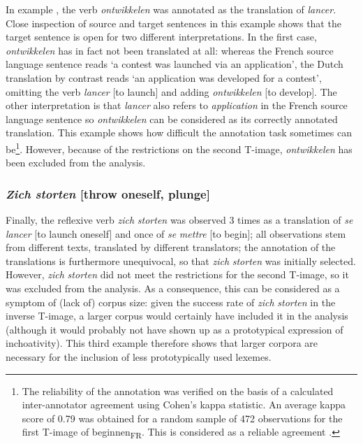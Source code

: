 In example , the verb \textit{ontwikkelen} was annotated as the translation of \textit{lancer}. Close inspection of source and target sentences in this example shows that the target sentence is open for two different interpretations. In the first case, \textit{ontwikkelen} has in fact not been translated at all: whereas the French source language sentence reads ‘a contest was launched via an application’, the Dutch translation by contrast reads ‘an application was developed for a contest’, omitting the verb \textit{lancer} [to launch] and adding \textit{ontwikkelen} [to develop]. The other interpretation is that \textit{lancer} also refers to \textit{application} in the French source language sentence so \textit{ontwikkelen} can be considered as its correctly annotated translation. This example shows how difficult the annotation task sometimes can be\footnote{The reliability of the annotation was verified on the basis of a calculated inter-annotator agreement using Cohen’s kappa statistic. An average kappa score of 0.79 was obtained for a random sample of 472 observations for the first T-image of beginnen\textsubscript{FR}. This is considered as a reliable agreement  \citep{carletta_assessing_1996}.}. However, because of the restrictions on the second T-image, \textit{ontwikkelen} has been excluded from the analysis.

\subsubsection{\textit{Zich storten} [throw oneself, plunge]}

Finally, the reflexive verb \textit{zich} \textit{storten} was observed 3 times as a translation of \textit{se} \textit{lancer} [to launch oneself] and once of \textit{se} \textit{mettre} [to begin]; all observations stem from different texts, translated by different translators; the annotation of the translations is furthermore unequivocal, so that \textit{zich} \textit{storten} was initially selected. However, \textit{zich} \textit{storten} did not meet the restrictions for the second T-image, so it was excluded from the analysis. As a consequence, this can be considered as a symptom of (lack of) corpus size: given the success rate of \textit{zich} \textit{storten} in the inverse T-image, a larger corpus would certainly have included it in the analysis (although it would probably not have shown up as a prototypical expression of inchoativity). This third example therefore shows that larger corpora are necessary for the inclusion of less prototypically used lexemes.


